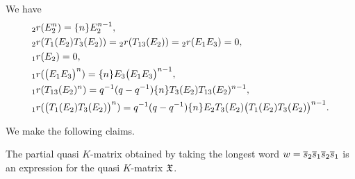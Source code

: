 \documentclass[a4 paper, 10pt]{article}
\begin{document}
\begin{lemma}\label{A3r}
We have
\begin{align*}
&{}_{2}r(E_2^n) = \{ n \} E_2^{n-1},\\
&{}_{2}r(T_1(E_2)T_3(E_2)) = {}_{2}r(T_{13}(E_2)) = {}_{2}r(E_1E_3) = 0,\\
&{}_{1}r(E_2) = 0,\\
&{}_{1}r( \big(E_1E_3 \big) ^n) = \{ n \} E_3 \big(E_1E_3 \big)^{n-1},\\
&{}_{1}r(T_{13}(E_2)^n ) = q^{-1}(q-q^{-1}) \{n \} T_3(E_2)T_{13}(E_2)^{n-1},\\
&{}_{1}r( \big( T_1(E_2)T_3(E_2) \big)^n) = q^{-1}(q-q^{-1}) \{ n \} E_2T_3(E_2) \big( T_1(E_2)T_3(E_2) \big)^{n-1}.
\end{align*}
\end{lemma}

\noindent We make the following claims.

\begin{proposition} \label{QkmA3}
The partial quasi $K$-matrix obtained by taking the longest word $w = \overline{s}_{2}\overline{s}_{1}\overline{s}_{2}\overline{s}_{1}$ is an expression for the quasi $K$-matrix $\mathfrak{X}$.


\end{proposition}
\end{document}
